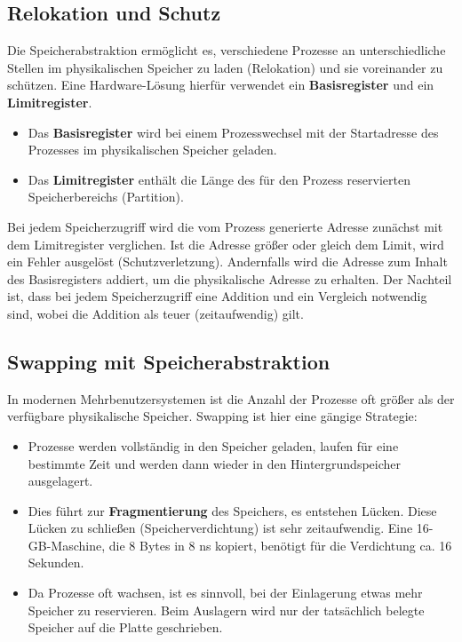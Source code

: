 \subsection{Relokation und Schutz}
Die Speicherabstraktion ermöglicht es, verschiedene Prozesse an unterschiedliche Stellen im physikalischen Speicher zu laden (Relokation) und sie voreinander zu schützen. Eine Hardware-Lösung hierfür verwendet ein \textbf{Basisregister} und ein \textbf{Limitregister}.
\begin{itemize}
    \item Das \textbf{Basisregister} wird bei einem Prozesswechsel mit der Startadresse des Prozesses im physikalischen Speicher geladen.
    \item Das \textbf{Limitregister} enthält die Länge des für den Prozess reservierten Speicherbereichs (Partition).
\end{itemize}
Bei jedem Speicherzugriff wird die vom Prozess generierte Adresse zunächst mit dem Limitregister verglichen. Ist die Adresse größer oder gleich dem Limit, wird ein Fehler ausgelöst (Schutzverletzung). Andernfalls wird die Adresse zum Inhalt des Basisregisters addiert, um die physikalische Adresse zu erhalten. Der Nachteil ist, dass bei jedem Speicherzugriff eine Addition und ein Vergleich notwendig sind, wobei die Addition als teuer (zeitaufwendig) gilt.

\subsection{Swapping mit Speicherabstraktion}
In modernen Mehrbenutzersystemen ist die Anzahl der Prozesse oft größer als der verfügbare physikalische Speicher. Swapping ist hier eine gängige Strategie:
\begin{itemize}
    \item Prozesse werden vollständig in den Speicher geladen, laufen für eine bestimmte Zeit und werden dann wieder in den Hintergrundspeicher ausgelagert.
    \item Dies führt zur \textbf{Fragmentierung} des Speichers, es entstehen Lücken. Diese Lücken zu schließen (Speicherverdichtung) ist sehr zeitaufwendig. Eine 16-GB-Maschine, die 8 Bytes in 8 ns kopiert, benötigt für die Verdichtung ca. 16 Sekunden.
    \item Da Prozesse oft wachsen, ist es sinnvoll, bei der Einlagerung etwas mehr Speicher zu reservieren. Beim Auslagern wird nur der tatsächlich belegte Speicher auf die Platte geschrieben.
\end{itemize}

